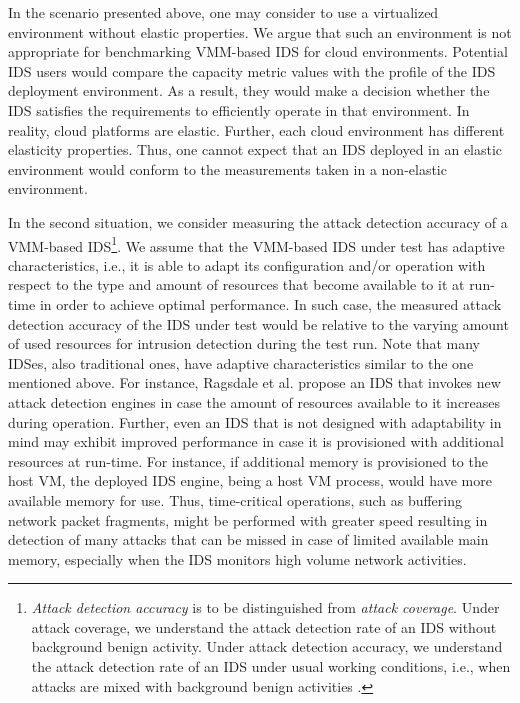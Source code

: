 In the scenario presented above, one may consider to use a virtualized environment without elastic properties. We argue that such an environment is not appropriate for benchmarking VMM-based IDS for cloud environments. 
Potential IDS users would compare the capacity metric values with the profile of the IDS deployment environment. As a result, they would make a decision whether the IDS satisfies the requirements to efficiently operate in that environment. 
In reality, cloud platforms are elastic. Further, each cloud environment has different elasticity properties. Thus, one cannot expect that an IDS deployed in an elastic environment would conform to the measurements taken in a non-elastic environment. 

In the second situation, we consider measuring the attack detection accuracy of a VMM-based IDS\footnote{\emph{Attack detection accuracy} is to be distinguished from \emph{attack coverage}. Under attack coverage, we understand the attack detection rate of an IDS without background benign activity. Under attack detection accuracy, we understand the attack detection rate of an IDS under usual working conditions, i.e., when attacks are mixed with background benign activities \cite{mell:anoverview}.}. We assume that the VMM-based IDS under test has adaptive characteristics, i.e., it is able to adapt its configuration and/or operation with respect to the type and amount of resources that become available to it at run-time in order to achieve optimal performance. In such case, the measured attack detection accuracy of the IDS under test would be relative to the varying amount of used resources for intrusion detection during the test run. Note that many IDSes, also traditional ones, have adaptive characteristics similar to the one mentioned above. For instance, Ragsdale et al. \cite{ragsdale:adaptation} propose an IDS that invokes new attack detection engines in case the amount of resources available to it increases during operation. Further, even an IDS that is not designed with adaptability in mind may exhibit improved performance in case it is provisioned with additional resources at run-time. For instance, if additional memory is provisioned to the host VM, the deployed IDS engine, being a host VM process, would have more available memory for use. Thus, time-critical operations, such as buffering network packet fragments, might be performed with greater speed resulting in detection of many attacks that can be missed in case of limited available main memory, especially when the IDS monitors high volume network activities. 


